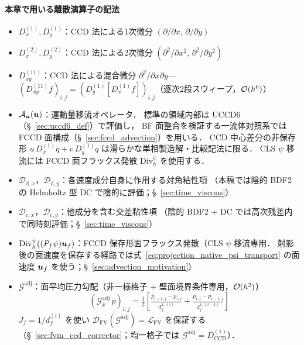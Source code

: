 \paragraph{本章で用いる離散演算子の記法}
\label{box:operator_notation}
\begin{itemize}[noitemsep]
  \item $D_x^{(1)}, D_y^{(1)}$：CCD 法による1次微分 $(\partial/\partial x,\, \partial/\partial y)$
  \item $D_x^{(2)}, D_y^{(2)}$：CCD 法による2次微分 $(\partial^2/\partial x^2,\, \partial^2/\partial y^2)$
  \item $D_{xy}^{(11)}$：CCD 法による混合微分 $\partial^2/\partial x\partial y$—
        $(D_{xy}^{(11)} f)_{i,j} = (D_y^{(1)}[D_x^{(1)} f])_{i,j}$（逐次2段スウィープ，$\mathcal{O}(h^6)$）
  \item $\mathcal{A}_{\bm{u}}(\bm{u})$：運動量移流オペレータ．
          標準の領域内部は UCCD6（§~\ref{sec:uccd6_def}）で評価し，
          BF 面整合を検証する一流体対照系では FCCD 面構成（§~\ref{sec:fccd_advection}）を用いる．
          CCD 中心差分の非保存形
          $u\,D_x^{(1)}q+v\,D_y^{(1)}q$ は滑らかな単相製造解・比較記法に限る．
          CLS $\psi$ 移流には FCCD 面フラックス発散 $\mathrm{Div}_h^{\psi}$ を使用する．
  \item $\mathcal{D}_{\mathrm{d},x}$，$\mathcal{D}_{\mathrm{d},y}$：各速度成分自身に作用する対角粘性項
        （本稿では陰的 BDF2 の Helmholtz 型 DC で陰的に評価；§~\ref{sec:time_viscous}）
  \item $\mathcal{D}_{\mathrm{c},x}$，$\mathcal{D}_{\mathrm{c},y}$：他成分を含む交差粘性項
        （陰的 BDF2 + DC では高次残差内で同時刻評価；§~\ref{sec:time_viscous}）
  \item $\mathrm{Div}_h^{\psi}((P_f\psi)\bm{u}_f)$：FCCD 保存形面フラックス発散（CLS $\psi$ 移流専用．
        射影後の面速度を保存する経路では式~\eqref{eq:projection_native_psi_transport} の面速度 $\bm{u}_f$ を使う；§~\ref{sec:advection_motivation}）
  \item $\mathcal{G}^\text{adj}$：面平均圧力勾配（非一様格子 + 壁面境界条件専用，$\mathcal{O}(h^2)$）
          \[
            (\mathcal{G}^\text{adj}_x\, p)_{i,j}
            = \tfrac{1}{2}\!\left[
                \tfrac{p_{i+1,j}-p_{i,j}}{d_f^{x,(i)}}
              + \tfrac{p_{i,j}-p_{i-1,j}}{d_f^{x,(i-1)}}
              \right]
          \]
          $J_f = 1/d_f^{(i)}$ を使い $\mathcal{D}_\text{FV}(\mathcal{G}^\text{adj}) = \mathcal{L}_\text{FV}$ を保証する
          （§~\ref{sec:fvm_ccd_corrector}；均一格子では $\mathcal{G}^\text{adj} = D^{(1)}_\text{CCD}$）．

\end{itemize}
